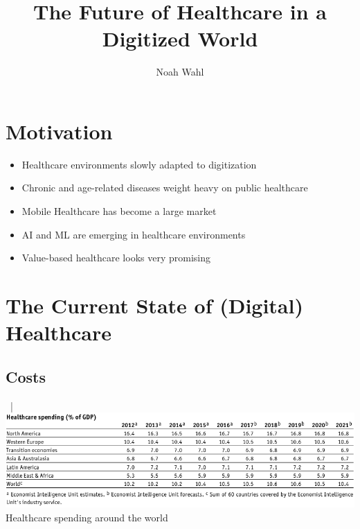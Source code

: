 \documentclass[xcolor=dvipsnames, aspectratio=1610]{beamer}
\title{The Future of Healthcare in a Digitized World}
\author{Noah Wahl}
\begin{document}
\frame{\titlepage}

\begin{frame}
    \tableofcontents
\end{frame}

\section{Motivation}%
\label{sec:motivation}

\begin{frame}{\secname}
    \begin{itemize}[<+->]
        \item Healthcare environments slowly adapted to digitization
        \item Chronic and age-related diseases weight heavy on public healthcare
        \item Mobile Healthcare has become a large market
        \item AI and ML are emerging in healthcare environments
        \item Value-based healthcare looks very promising
    \end{itemize}
\end{frame}

\section{The Current State of (Digital) Healthcare}%
\label{sec:the_current_state_of_digital_healthcare}

\subsection{Costs}%
\label{sub:costs}

\begin{frame}{\secname\ | \subsecname}
    \centering
    \includegraphics[width=\textwidth]{../media/Screenshot_2020-01-09_01_FULL_REPORT-World_healthcare_and.png} \\
    \small{Healthcare spending around the world}
\end{frame}
\end{document}
